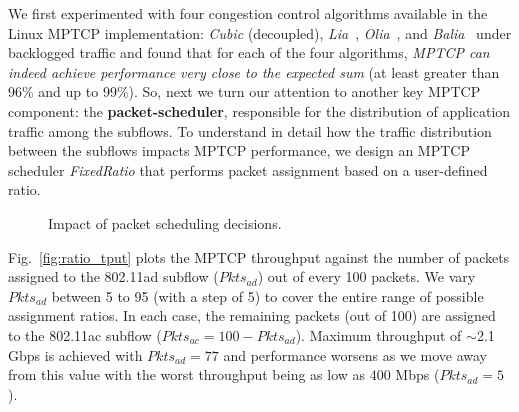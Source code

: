 We first experimented with four congestion control algorithms available in the
Linux MPTCP implementation: \emph{Cubic} (decoupled), \emph{Lia}~\cite{raiciu:rfc6356}, 
\emph{Olia}~\cite{khalili:ton2013}, and \emph{Balia}~\cite{peng:ton2016} under backlogged
traffic and found that for each of the four algorithms, \textit{MPTCP can indeed achieve 
performance very close to the expected sum} (at least greater than 96\% and up to 99\%). So,
 next we turn our attention to another key MPTCP component: the \textbf{packet-scheduler},
responsible for the distribution of application traffic among the subflows. To understand in 
detail how the traffic distribution between the subflows impacts MPTCP performance, we 
design an MPTCP scheduler \emph{FixedRatio} that performs packet assignment based on
a user-defined ratio.

\begin{figure}[h]
    \centering
    \hfill
    \vspace{-0.15in}
    \caption{Impact of packet scheduling decisions.}
    \vspace{-0.1in}
\end{figure}

Fig.~\ref{fig:ratio_tput} plots the MPTCP throughput against the
number of packets assigned to the 802.11ad subflow ($Pkts_{ad}$) out
of every 100 packets. We vary $Pkts_{ad}$ between 5 to 95 (with a step
of 5) to cover the entire range of possible assignment ratios. In each
case, the remaining packets (out of 100) are assigned to the 802.11ac
subflow ($Pkts_{ac}=100-Pkts_{ad}$). Maximum throughput of $\sim$2.1
Gbps is achieved with $Pkts_{ad}=77$ and performance worsens as we
move away from this value with the worst throughput being as low as
400 Mbps ($Pkts_{ad}=5$).

